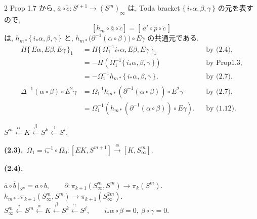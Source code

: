 \documentclass[10pt, leqno]{ltjsarticle} %
\newcommand{\toda}[1]{\{\,#1\,\}}              %
\newcommand{\todai}[2][]{\{\,#2\,\}_{#1}}      %
\newcommand{\ext}[1]{\overline{#1}}     %
\numberwithin{equation}{section}
\theoremstyle{plain}
\theoremstyle{definition}
\theoremstyle{remark}
\begin{document}
\begin{paracol}{2}
Prop 1.7 から, $\overline{a}\circ\widetilde{c}:S^{i+1}\to(S^m)_\infty$ は,
Toda bracket $\toda{i_*\alpha,\beta,\gamma}$ の元を表すので,
\[
[h_m\circ \ext{a}\circ\widetilde{c}]=[\,a'\circ p\circ\widetilde{c}\,]
\]
は, $h_{m*}\{\,i_*\alpha,\beta,\gamma\,\}$ と,
$h_{m*}\!\bigl(\partial^{-1}(\alpha\circ\beta)\bigr)\circ E\gamma$ 
の共通元である. 
\begin{align*}
H\todai[1]{E\alpha,E\beta,E\gamma}
& = H\todai[1]{\Omega_1^{-1}i_*\alpha,E\beta,E\gamma}
&& \text{by (2.4)},\\
& = -H(\Omega_1^{-1}\toda{i_*\alpha,\beta,\gamma})
&& \text{by Prop1.3},\\
& = -\Omega_1^{-1}h_{m*}\todai{i_*\alpha,\beta,\gamma} .
&& \text{by (2.7)}.\\
\Delta^{-1}(\alpha\circ\beta)\circ E^2\gamma
& = \Omega_1^{-1}h_{m*}(\partial^{-1}(\alpha\circ\beta))\circ E^2\gamma
&& \text{by (2.7)},\\
& = \Omega_1^{-1}(h_{m*}(\partial^{-1}(\alpha\circ\beta))\circ E\gamma).
&& \text{by (1.12)}.
\end{align*}

\switchcolumn

\noindent
\(S^m\xleftarrow{\alpha}
K\xleftarrow{\beta}
S^k \xleftarrow{\gamma} S^i\).

\noindent
\textbf{(2.3).}\
\(\Omega_1 = i_*^{-1}\circ\Omega_0:
[EK, S^{m+1}]\xrightarrow{\cong}[K, S^m_\infty]\).

\noindent
\textbf{(2.4).}\\

\noindent
\(\overline{a}\circ\overline{b}\ |_{S^n} = a\circ b,\qquad
\partial:\pi_{k+1}(S^m_\infty, S^m)\to\pi_k(S^m)\).\\
\(h_{m*}:\pi_{k+1}(S^m_\infty,S^m)\to\pi_{k+1}(S^{2m}_\infty)\).\\
\(S^m_\infty\xleftarrow{i}
S^m\xleftarrow{\alpha}
K\xleftarrow{\beta}
S^k \xleftarrow{\gamma}
S^j,\qquad
i_*\alpha\circ\beta=0,\ 
\beta\circ\gamma=0.\)


\end{paracol}
\end{document}
